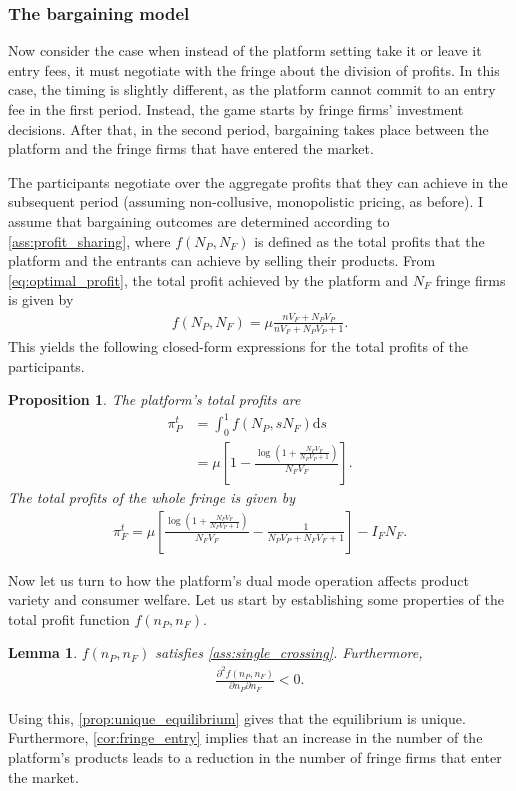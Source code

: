 \documentclass[a4paper]{article}
\newtheorem{proposition}{Proposition}
\newtheorem{lemma}{Lemma}
\newcommand{\ds}{\mathrm{d}s}
\begin{document}
\subsubsection{The bargaining model}

Now consider the case when instead of the platform setting take it or leave it entry fees, it must negotiate with the fringe about the division of profits.
In this case, the timing is slightly different, as the platform cannot commit to an entry fee in the first period.
Instead, the game starts by fringe firms' investment decisions.
After that, in the second period, bargaining takes place between the platform and the fringe firms that have entered the market.

The participants negotiate over the aggregate profits that they can achieve in the subsequent period (assuming non-collusive, monopolistic pricing, as before).
I assume that bargaining outcomes are determined according to \cref{ass:profit_sharing}, where $f(N_P, N_F)$ is defined as the total profits that the platform and the entrants can achieve by selling their products.
From \cref{eq:optimal_profit}, the total profit achieved by the platform and $N_F$ fringe firms is given by
\begin{align*}
    f(N_P, N_F) = \mu \frac{n V_F + N_P V_P}{n V_F + N_P V_P + 1}.
\end{align*}
This yields the following closed-form expressions for the total profits of the participants.
\begin{proposition}
    The platform's total profits are
    \begin{align*}
        \pi^t_P &=\int_0^1 f(N_P, sN_F) \ds \\
                &= \mu \left[ 1 - \frac{\log \left(1 + \frac{N_F V_F}{N_P V_P + 1} \right)}{N_F V_F} \right].
    \end{align*}
    The total profits of the whole fringe is given by
    \begin{align*}
        \pi^t_F = \mu \left[ \frac{\log \left( 1 + \frac{N_F V_F}{N_P V_P + 1} \right)}{N_F V_F} - \frac{1}{N_P V_P + N_F V_F + 1} \right] - I_F N_F.
    \end{align*}
\end{proposition}

Now let us turn to how the platform's dual mode operation affects product variety and consumer welfare.
Let us start by establishing some properties of the total profit function $f(n_P, n_F)$.
\begin{lemma}
    \label{lem:profit_assumptions}
    $f(n_P, n_F)$ satisfies \cref{ass:single_crossing}.
    Furthermore,
    \begin{align*}
        \frac{\partial^2 f(n_P, n_F)}{\partial n_P \partial n_F} < 0.
    \end{align*}
\end{lemma}
Using this, \cref{prop:unique_equilibrium} gives that the equilibrium is unique.
Furthermore, \cref{cor:fringe_entry} implies that an increase in the number of the platform's products leads to a reduction in the number of fringe firms that enter the market.
\end{document}
